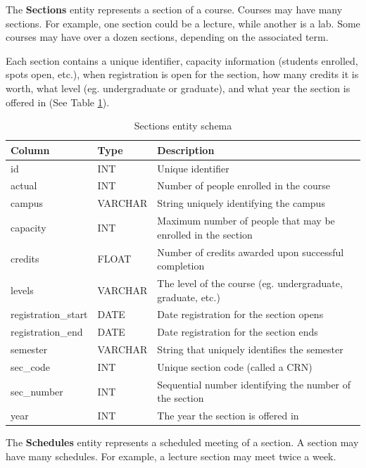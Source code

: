 \documentclass[12pt,letterpaper,oneside,notitlepage]{report}
\theoremstyle{definition}
\begin{document}
      The \textbf{Sections} entity represents a section of a course.  Courses may have many sections.  For example, one section could be a lecture, while another is a lab.  Some courses may have over a dozen sections, depending on the associated term.
      
      Each section contains a unique identifier, capacity information (students enrolled, spots open, etc.), when registration is open for the section, how many credits it is worth, what level (eg. undergraduate or graduate), and what year the section is offered in (See Table \ref{tbl:sections-entity-schema}).
      
      \begin{table}[!htp]
        \centering
        \begin{tabular}{lll}
          \toprule
          Column & Type & Description \\
          \midrule
          id & INT & Unique identifier \\
          actual & INT & Number of people enrolled in the course \\
          campus & VARCHAR & String uniquely identifying the campus \\
          capacity & INT & Maximum number of people that may be enrolled in the section \\
          credits & FLOAT & Number of credits awarded upon successful completion \\
          levels & VARCHAR & The level of the course (eg. undergraduate, graduate, etc.) \\
          registration\_start & DATE & Date registration for the section opens \\
          registration\_end & DATE & Date registration for the section ends \\
          semester & VARCHAR & String that uniquely identifies the semester \\
          sec\_code & INT & Unique section code (called a CRN) \\
          sec\_number & INT & Sequential number identifying the number of the section \\
          year & INT & The year the section is offered in \\
          \bottomrule
        \end{tabular}
        \caption{Sections entity schema}
        \label{tbl:sections-entity-schema}
      \end{table}
      
      The \textbf{Schedules} entity represents a scheduled meeting of a section.  A section may have many schedules.  For example, a lecture section may meet twice a week.
      
\end{document}
